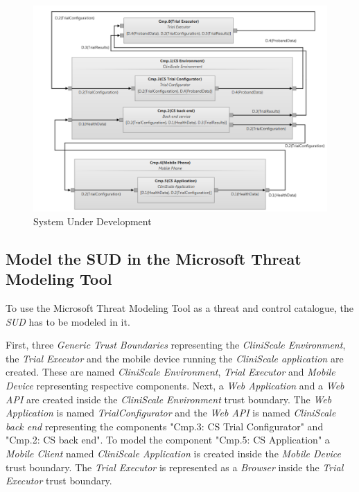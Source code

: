\begin{figure}[H]
  \includegraphics[width=1.4\linewidth, angle=90]{images/sud.png}
  \caption{System Under Development}
  \label{fig:sud}
\end{figure}

\subsection{Model the SUD in the Microsoft Threat Modeling Tool}
\label{SUDMTMT}
To use the Microsoft Threat Modeling Tool as a threat and control catalogue, the \textit{SUD} has to be modeled in it. 

First, three \textit{Generic Trust Boundaries} representing the \textit{CliniScale Environment}, the \textit{Trial Executor} and the mobile device running the \textit{CliniScale application} are created. These are named \textit{CliniScale Environment}, \textit{Trial Executor} and \textit{Mobile Device} representing respective components.
Next, a \textit{Web Application} and a \textit{Web API} are created inside the \textit{CliniScale Environment} trust boundary. The \textit{Web Application} is named \textit{TrialConfigurator} and the \textit{Web API} is named \textit{CliniScale back end} representing the components "Cmp.3: CS Trial Configurator" and "Cmp.2: CS back end".
To model the component "Cmp.5: CS Application" a \textit{Mobile Client} named \textit{CliniScale Application} is created inside the \textit{Mobile Device} trust boundary.
The \textit{Trial Executor} is represented as a \textit{Browser} inside the \textit{Trial Executor} trust boundary.

